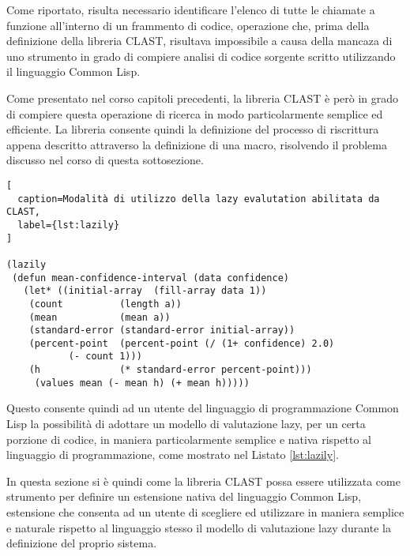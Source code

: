 Come riportato, risulta necessario identificare l'elenco di tutte le chiamate a
funzione all'interno di un frammento di codice, operazione che, prima della
definizione della libreria CLAST, risultava impossibile a causa della mancaza di
uno strumento in grado di compiere analisi di codice sorgente scritto
utilizzando il linguaggio Common Lisp.

Come presentato nel corso capitoli precedenti, la libreria CLAST è però in grado
di compiere questa operazione di ricerca in modo particolarmente semplice ed
efficiente. La libreria consente quindi la definizione del processo di
riscrittura appena descritto attraverso la definizione di una macro, risolvendo
il problema discusso nel corso di questa sottosezione.\\

\begin{lstlisting}[
  caption=Modalità di utilizzo della lazy evalutation abilitata da CLAST,
  label={lst:lazily}
]

(lazily
 (defun mean-confidence-interval (data confidence)
   (let* ((initial-array  (fill-array data 1))
    (count          (length a))
    (mean           (mean a))
    (standard-error (standard-error initial-array))
    (percent-point  (percent-point (/ (1+ confidence) 2.0)
           (- count 1)))
    (h              (* standard-error percent-point)))
     (values mean (- mean h) (+ mean h)))))

\end{lstlisting}

Questo consente quindi ad un utente del linguaggio di programmazione Common Lisp
la possibilità di adottare un modello di valutazione lazy, per un certa porzione
di codice, in maniera particolarmente semplice e nativa rispetto al linguaggio
di programmazione, come mostrato nel Listato \ref{lst:lazily}.

In questa sezione si è quindi come la libreria CLAST possa essere utilizzata
come strumento per definire un estensione nativa del linguaggio Common Lisp,
estensione che consenta ad un utente di scegliere ed utilizzare in maniera
semplice e naturale rispetto al linguaggio stesso il modello di valutazione lazy
durante la definizione del proprio sistema.
